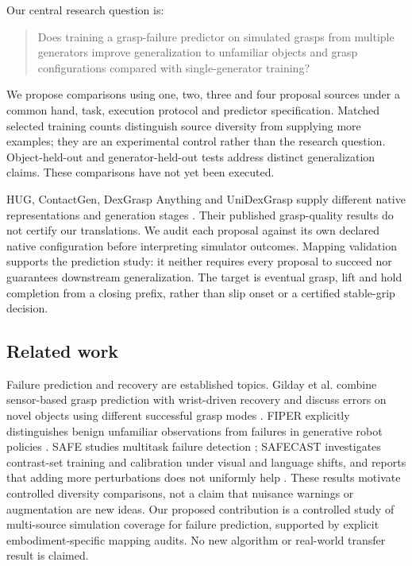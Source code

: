 \documentclass[10pt,letterpaper]{article}
\begin{document}
Our central research question is:
\begin{quote}
Does training a grasp-failure predictor on simulated grasps from multiple
generators improve generalization to unfamiliar objects and grasp configurations
compared with single-generator training?
\end{quote}
We propose comparisons using one, two, three and four proposal sources under a
common hand, task, execution protocol and predictor specification. Matched
selected training counts distinguish source diversity from supplying more
examples; they are an experimental control rather than the research question.
Object-held-out and generator-held-out tests address distinct generalization
claims. These comparisons have not yet been executed.

HUG, ContactGen, DexGrasp Anything and UniDexGrasp supply different native
representations and generation stages \cite{hug,contactgen,dga,unidex}.
Their published grasp-quality results do not certify our translations.
We audit each proposal against its own declared native configuration before
interpreting simulator outcomes. Mapping validation supports the prediction
study: it neither requires every proposal to succeed nor guarantees downstream
generalization. The target is eventual grasp, lift and hold completion from a
closing prefix, rather than slip onset or a certified stable-grip decision.

\subsection{Related work}
Failure prediction and recovery are established topics. Gilday et al. combine
sensor-based grasp prediction with wrist-driven recovery and discuss errors on
novel objects using different successful grasp modes \cite{gilday}. FIPER
explicitly distinguishes benign unfamiliar observations from failures in
generative robot policies \cite{fiper}. SAFE studies multitask failure detection
\cite{safe}; SAFECAST investigates contrast-set training and calibration under
visual and language shifts, and reports that adding more perturbations does
not uniformly help \cite{safecast}. These results motivate controlled diversity
comparisons, not a claim that nuisance warnings or augmentation are new ideas.
Our proposed contribution is a controlled study of multi-source simulation
coverage for failure prediction, supported by explicit embodiment-specific
mapping audits. No new algorithm or real-world transfer result is claimed.
\end{document}
